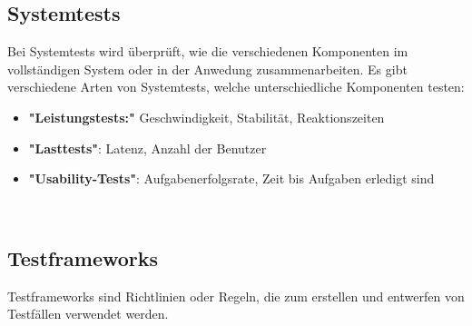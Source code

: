 \subsection{Systemtests}
Bei Systemtests wird überprüft, wie die verschiedenen Komponenten im vollständigen System oder in der Anwedung
zusammenarbeiten.
\newline
Es gibt verschiedene Arten von Systemtests, welche unterschiedliche Komponenten testen:
\begin{itemize}
  \item \textbf{"Leistungstests:"}
  Geschwindigkeit, Stabilität, Reaktionszeiten
  \item \textbf{"Lasttests"}:
  Latenz, Anzahl der Benutzer
  \item \textbf{"Usability-Tests"}:
  Aufgabenerfolgsrate, Zeit bis Aufgaben erledigt sind
\end{itemize}
~\cite{systemtest}

\subsection{Testframeworks}
Testframeworks sind Richtlinien oder Regeln, die zum erstellen und entwerfen von Testfällen
verwendet werden.

~\cite{testframework}

